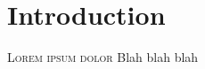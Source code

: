 \chapter{Introduction}
\lettrine[lines=4, loversize=-0.1, lraise=0.1]{L}{orem ipsum dolor} Blah blah blah




